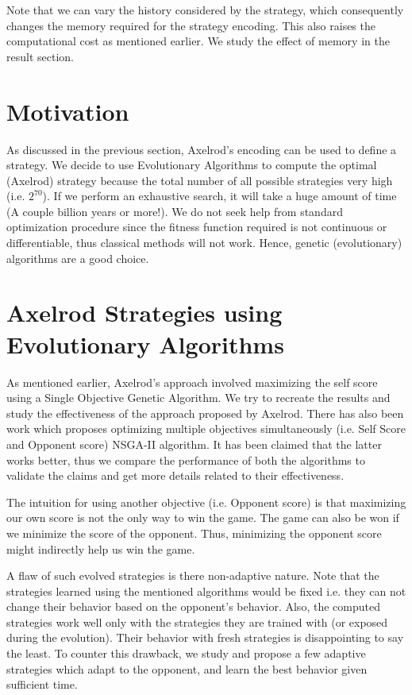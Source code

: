 \documentclass[a4paper]{article}
\begin{document}
	Note that we can vary the history considered by the strategy, which consequently changes the memory required for the strategy encoding. This also raises the computational cost as mentioned earlier. We study the effect of memory in the result section.
	
	\section{Motivation}
	
	As discussed in the previous section, Axelrod's encoding can be used to define a strategy. We decide to use Evolutionary Algorithms to compute the optimal (Axelrod) strategy because the total number of all possible strategies very high (i.e. $2^{70}$). If we perform an exhaustive search, it will take a huge amount of time (A couple billion years or more!). We do not seek help from standard optimization procedure since the fitness function required is not continuous or differentiable, thus classical methods will not work. Hence, genetic (evolutionary) algorithms are a good choice.

	\section{Axelrod Strategies using Evolutionary Algorithms}

	As mentioned earlier, Axelrod's approach involved maximizing the self score using a Single Objective Genetic Algorithm. We try to recreate the results and study the effectiveness of the approach proposed by Axelrod. There has also been work which proposes optimizing multiple objectives simultaneously (i.e. Self Score and Opponent score) NSGA-II algorithm. It has been claimed that the latter works better, thus we compare the performance of both the algorithms to validate the claims and get more details related to their effectiveness.
	
	The intuition for using another objective (i.e. Opponent score) is that maximizing our own score is not the only way to win the game. The game can also be won if we minimize the score of the opponent. Thus, minimizing the opponent score might indirectly help us win the game.
	
	A flaw of such evolved strategies is there non-adaptive nature. Note that the strategies learned using the mentioned algorithms would be fixed i.e. they can not change their behavior based on the opponent's behavior. Also, the computed strategies work well only with the strategies they are trained with (or exposed during the evolution). Their behavior with fresh strategies is disappointing to say the least. To counter this drawback, we study and propose a few adaptive strategies which adapt to the opponent, and learn the best behavior given sufficient time.
	
\end{document}
